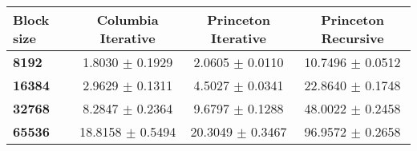 \begin{tabular}{lccc}\toprule
\textbf{Block size}  & \textbf{Columbia Iterative} & \textbf{Princeton Iterative} & \textbf{Princeton Recursive}\\\midrule
\textbf{8192}  & 1.8030 $\pm$ 0.1929 & 2.0605 $\pm$ 0.0110 & 10.7496 $\pm$ 0.0512\\
\textbf{16384}  & 2.9629 $\pm$ 0.1311 & 4.5027 $\pm$ 0.0341 & 22.8640 $\pm$ 0.1748\\
\textbf{32768}  & 8.2847 $\pm$ 0.2364 & 9.6797 $\pm$ 0.1288 & 48.0022 $\pm$ 0.2458\\
\textbf{65536} & 18.8158 $\pm$ 0.5494 & 20.3049 $\pm$ 0.3467 & 96.9572 $\pm$ 0.2658\\
\bottomrule
\end{tabular}
